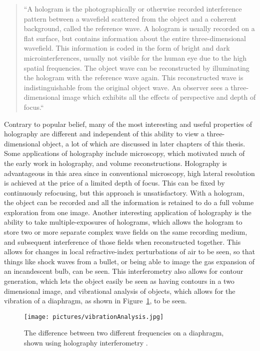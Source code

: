 \begin{quote}
``A hologram is the photographically or otherwise recorded
interference pattern between a wavefield scattered from the
object and a coherent background, called the reference wave.
A hologram is usually recorded on a flat surface, but contains
information about the entire three-dimensional wavefield.
This information is coded in the form of bright and dark
microinterferences, usually not visible for the human eye due
to the high spatial frequencies. The object wave can be
reconstructed by illuminating the hologram with the reference
wave again. This reconstructed wave is indistinguishable from
the original object wave. An observer sees a three-dimensional
image which exhibits all the effects of perspective and depth
of focus.``\cite{schnars_digital_2002}
\end{quote}
Contrary to popular belief, many of the most interesting and useful properties
of holography are different and independent of this ability to view a
three-dimensional object, a lot of which are discussed in later chapters of
this thesis. Some applications of holography include microscopy, which
motivated much of the early work in holography, and volume reconstructions.
Holography is advantageous in this area since in conventional microscopy, high
lateral resolution is achieved at the price of a limited depth of focus. This
can be fixed by continuously refocusing, but this approach is unsatisfactory.
With a hologram, the object can be recorded and all the information is retained
to do a full volume exploration from one image.
Another interesting application of holography is the ability to take
multiple-exposures of holograms, which allows the hologram to store two or more
separate complex wave fields on the same recording medium, and subsequent
interference of those fields when reconstructed together. This allows for
changes in local refractive-index perturbations of air to be seen, so that
things like shock waves from a bullet, or being able to image the gas expansion
of an incandescent bulb, can be seen. This interferometry also allows for
contour generation, which lets the object easily be seen as having contours in
a two dimensional image, and vibrational analysis of objects, which allows for
the vibration of a diaphragm, as shown in Figure~\ref{fig:vibrationAnalysis}, to be seen.

\begin{figure}[htbp!]
\begin{center}
    \texttt{[image: pictures/vibrationAnalysis.jpg]}
\end{center}
\caption{The difference between two different frequencies on a diaphragm, shown
    using holography interferometry \cite{vibration}.}
\label{fig:vibrationAnalysis}
\end{figure}


